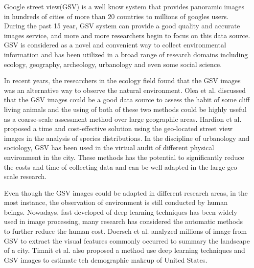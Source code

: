Google street view(GSV) is a well know system that provides panoramic images in hundreds of cities of more than 20 countries to millions of googles users. During the past 15 year, GSV system can provide a good quality and accurate images service, and more and more researchers begin to focus on this data source\cite{anguelov2010google}. GSV is considered as a novel and convenient way to collect environmental information and has been utilized in a broad range of research domains including ecology, geography, archeology, urbanology and even some social science. 

In recent years, the researchers in the ecology field found that the GSV images was an alternative way to observe the natural environment. Olea et al. \cite{olea2013assessing} discussed that the GSV images could be a good data source to assess the habit of some cliff living animals and the using of both of these two methods could be highly useful as a coarse-scale assessment method over large geographic areas. Hardion et al.\cite{hardion2016species} proposed a  time and cost-effective solution using the geo-located street view images in the analysis of species distributions. In the discipline of urbanology and sociology, GSV has been used in the virtual audit of different physical environment\cite{clarke2010using, rundle2011using, kelly2013using, vanwolleghem2014assessing} in the city. These methods has the potential to significantly reduce the costs and time of collecting data and can be well adapted in the large geo-scale research. 

Even though the GSV images could be adapted in different research areas, in the most instance, the observation of environment is still conducted by human beings. Nowadays, fast developed of deep learning techniques has been widely used in image processing, many research has considered the automatic methods to further reduce the human cost. Doersch et al.\cite{doersch2015makes} analyzed millions of image from GSV to extract the visual features commonly occurred to summary the landscape of a city. Timnit et al.\cite{gebru2017using} also proposed a method use deep learning techniques and GSV images to estimate teh demographic makeup of United States.
\fi
